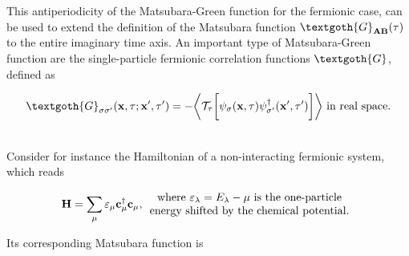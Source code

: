 This antiperiodicity of the Matsubara-Green function for the fermionic case, can be used to extend the definition of the Matsubara function $\textgoth{G}_{{\bf AB}}(\tau)$ to the entire imaginary time axis. An important type of Matsubara-Green function are the single-particle fermionic correlation functions $\textgoth{G}$, defined as 

\begin{equation}
    \begin{split}
        \textgoth{G}_{\sigma \sigma'}({\bf x}, \tau; {\bf x}', \tau') = - \bigg\langle \mathcal{T}_{\tau} \bigg[\psi_{\sigma}({\bf x}, \tau) \psi^\dagger_{\sigma'}({\bf x}', \tau')\bigg] \bigg\rangle \textnormal{ in real space}.
 \end{split}
 \end{equation}
 
\blanky \\

Consider for instance the Hamiltonian of a non-interacting fermionic system, which reads 

\begin{equation}
    {\bf H} = \sum_{\mu} \varepsilon_{\mu} {\bf c}_{\mu}^\dagger {\bf c}_{\mu}, 
\begin{array}{cc}
    \textnormal{ where $\varepsilon_{\lambda} = E_{\lambda} - \mu$ is the one-particle } \\
    \textnormal{energy shifted by the chemical potential.} \label{Matsubara_Green_Non_interacting_fermion_Hamiltonian}
\end{array}
\end{equation}

Its corresponding Matsubara function is 

